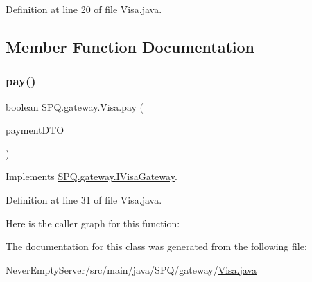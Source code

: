 Definition at line 20 of file Visa.\+java.



\subsection{Member Function Documentation}
\mbox{\label{class_s_p_q_1_1gateway_1_1_visa_a0ecda0414a0685174ec12ae96c8d3a68}} 
\subsubsection{\texorpdfstring{pay()}{pay()}}
{\footnotesize\ttfamily boolean S\+P\+Q.\+gateway.\+Visa.\+pay (\begin{DoxyParamCaption}\item[{\mbox{\hyperlink{class_s_p_q_1_1dto_1_1_payment_d_t_o}{Payment\+D\+TO}}}]{payment\+D\+TO }\end{DoxyParamCaption})}



Implements \mbox{\hyperlink{interface_s_p_q_1_1gateway_1_1_i_visa_gateway_adb8feee5084ca3e28c61360719a24c7a}{S\+P\+Q.\+gateway.\+I\+Visa\+Gateway}}.



Definition at line 31 of file Visa.\+java.

Here is the caller graph for this function\+:


The documentation for this class was generated from the following file\+:\begin{DoxyCompactItemize}
\item 
Never\+Empty\+Server/src/main/java/\+S\+P\+Q/gateway/\mbox{\hyperlink{_visa_8java}{Visa.\+java}}\end{DoxyCompactItemize}
